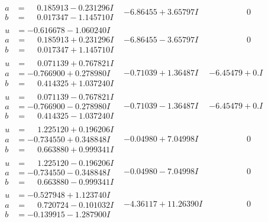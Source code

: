 \documentclass[1p]{elsarticle_modified}
\theoremstyle{definition}
\begin{document}
$$\begin{array}{c|c|c}
\begin{aligned}
a &= \phantom{-}0.185913 - 0.231296 I \\
b &= \phantom{-}0.017347 - 1.145710 I\end{aligned}
 & -6.86455 + 3.65797 I & \phantom{-0.000000 } 0 \\ \hline\begin{aligned}
u &= -0.616678 - 1.060240 I \\
a &= \phantom{-}0.185913 + 0.231296 I \\
b &= \phantom{-}0.017347 + 1.145710 I\end{aligned}
 & -6.86455 - 3.65797 I & \phantom{-0.000000 } 0 \\ \hline\begin{aligned}
u &= \phantom{-}0.071139 + 0.767821 I \\
a &= -0.766900 + 0.278980 I \\
b &= \phantom{-}0.414325 + 1.037240 I\end{aligned}
 & -0.71039 + 1.36487 I & -6.45479 + 0. I\phantom{ +0.000000I} \\ \hline\begin{aligned}
u &= \phantom{-}0.071139 - 0.767821 I \\
a &= -0.766900 - 0.278980 I \\
b &= \phantom{-}0.414325 - 1.037240 I\end{aligned}
 & -0.71039 - 1.36487 I & -6.45479 + 0. I\phantom{ +0.000000I} \\ \hline\begin{aligned}
u &= \phantom{-}1.225120 + 0.196206 I \\
a &= -0.734550 + 0.348848 I \\
b &= \phantom{-}0.663880 + 0.999341 I\end{aligned}
 & -0.04980 + 7.04998 I & \phantom{-0.000000 } 0 \\ \hline\begin{aligned}
u &= \phantom{-}1.225120 - 0.196206 I \\
a &= -0.734550 - 0.348848 I \\
b &= \phantom{-}0.663880 - 0.999341 I\end{aligned}
 & -0.04980 - 7.04998 I & \phantom{-0.000000 } 0 \\ \hline\begin{aligned}
u &= -0.527948 + 1.123740 I \\
a &= \phantom{-}0.720724 - 0.101032 I \\
b &= -0.139915 - 1.287900 I\end{aligned}
 & -4.36117 + 11.26390 I & \phantom{-0.000000 } 0\\

\end{array}$$
\end{document}
